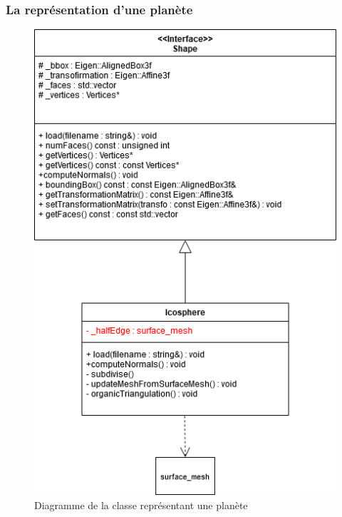\documentclass[a4paper]{article}
\begin{document}
\subsubsection{La représentation d'une planète}

 \begin{figure}[!ht]
        \begin{center} \includegraphics[width=0.6\linewidth]{img/archi/model_shape.png}\end{center}
        \caption{\label{archi_shape}Diagramme de la classe représentant une planète}
    \end{figure}
    
\end{document}
